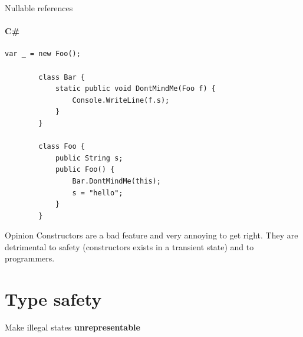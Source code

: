 \documentclass[compress,12pt,xcolor={dvipsnames}]{beamer}
\begin{document}
\begin{frame}[fragile]{Nullable references}
    \framesubtitle{C\#}
    \begin{lstlisting}[gobble=8,language=CSharp,basicstyle=\scriptsize]
        var _ = new Foo();
        
        class Bar {
            static public void DontMindMe(Foo f) {
                Console.WriteLine(f.s);
            }
        }
        
        class Foo {
            public String s;
            public Foo() {
                Bar.DontMindMe(this);
                s = "hello";
            }
        }
        \end{lstlisting}
    \pause

    \begin{alertblock}{Opinion}
        Constructors are a bad feature and very annoying to get right. They are detrimental to safety (constructors exists in a transient state) and to programmers.
    \end{alertblock}
\end{frame}


\section{Type safety}


\begin{frame}[standout]
    \centering\large
    Make illegal states \textbf{unrepresentable}
\end{frame}
\end{document}
